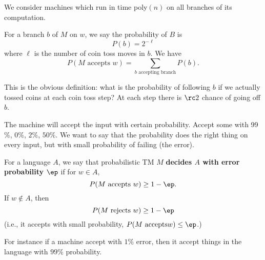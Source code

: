 We consider machines which run in time poly$(n)$ on all branches of its computation.
\begin{df}
For a branch $b$ of $M$ on $w$, we say the probability of $B$ is 
\[
P(b)=2^{-\ell}
\]
where $\ell$ is the number of coin toss moves in $b$.
We have
\[
P(M\text{ accepts }w)=\sum_{b\text{ accepting branch}} P(b).
\]
\end{df}
This is the obvious definition: what is the probability of following $b$ if we actually tossed coins at each coin toss step? At each step there is $\rc2$ chance of going off $b$.

The machine will accept the input with certain probability. Accept some with 99$\%$, $0\%$, $2\%$, $50\%$. We want to say that the probability does the right thing on every input, but with small probability of failing (the error).
\begin{df}
For a language $A$, we say that probabilistic TM $M$ \textbf{decides $A$ with error probability $\ep$} if for $w\in A$, 
\[
P(M\text{ accepts }w)\ge 1-\ep.
\]
If $w\nin A$, then
\[
P(M\text{ rejects }w)\ge 1-\ep
\]
(i.e., it accepts with small probability, $P(M\text{ accepts} w)\le \ep$.)
\end{df}

For instance if a machine accept with $1\%$ error, then it accept things in the language with $99\%$ probability.

